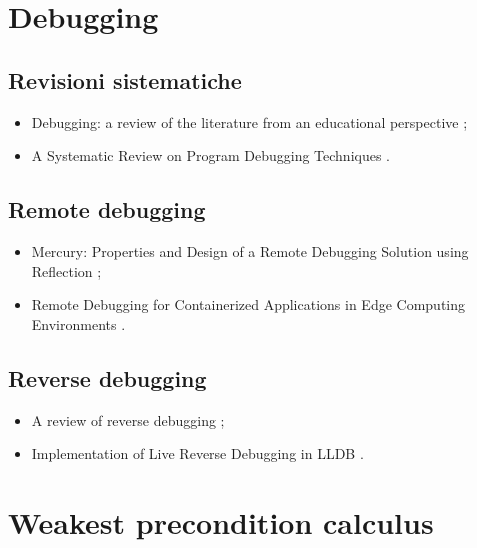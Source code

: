\section*{Debugging}

\subsection*{Revisioni sistematiche}
\begin{itemize}

\item Debugging: a review of the literature from an educational perspective \cite{mccauley2008debugreview};

\item A Systematic Review on Program Debugging Techniques \cite{ghosh2019debugreview}.

\end{itemize}

\subsection*{Remote debugging}
\begin{itemize}

\item Mercury: Properties and Design of a Remote Debugging Solution using Reflection \cite{papoulias2015remotedebug};

\item Remote Debugging for Containerized Applications in Edge Computing Environments \cite{ozcan2019remotedebug}.

\end{itemize}

\subsection*{Reverse debugging}
\begin{itemize}

\item A review of reverse debugging \cite{engblom2012reversedebug};

\item Implementation of Live Reverse Debugging in LLDB \cite{savidis2021reversedebug}.

\end{itemize}

\section*{Weakest precondition calculus}

